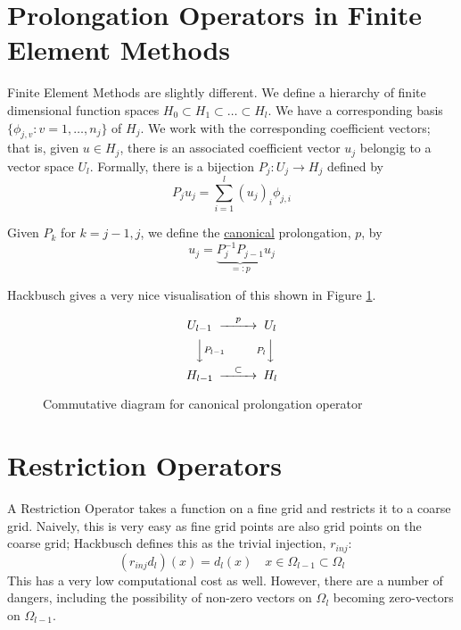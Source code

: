 \documentclass[a4paper,10pt,oneside]{book}
\theoremstyle{plain}%
\theoremstyle{definition}
\theoremstyle{remark}
\begin{document}
\section{Prolongation Operators in Finite Element Methods}
Finite Element Methods are slightly different. We define a hierarchy of finite
dimensional function spaces $H_0\subset H_1\subset\dots\subset H_l$. We have a
corresponding basis $\{\phi_{j,v}:v=1,\dots,n_j\}$ of $H_j$. We work with the
corresponding coefficient vectors; that is, given $u\in H_j$, there is an
associated coefficient vector $u_j$ belongig to a vector space $U_l$. Formally,
there is a bijection $P_j:U_j\to H_j$ defined by
\begin{equation}
 P_ju_j=\sum_{i=1}^l(u_j)_i\phi_{j,i}
\end{equation}

Given $P_k$ for $k=j-1,j$, we define the \underline{canonical} prolongation,
$p$, by
\begin{equation}
 u_j = \underbrace{P_j^{-1}P_{j-1}}_{=:p}u_j
\end{equation}

Hackbusch \cite{Hackbusch85} gives a very nice visualisation of this shown in
Figure \ref{fig:canonical_prolongation}.

\begin{figure}
 \begin{equation}
  \begin{CD}
   U_{l-1} @>p>> U_l\\
   @VV{P_{l-1}}V   @V{P_l}VV\\
   H_{l-1} @>{\subset}>> H_l
  \end{CD}
 \end{equation}
 \caption{Commutative diagram for canonical prolongation operator}
\label{fig:canonical_prolongation}
\end{figure}

\section{Restriction Operators}
A Restriction Operator takes a function on a fine grid and restricts it to a
coarse grid. Naively, this is very easy as fine grid points are also grid
points on the coarse grid; Hackbusch \cite{Hackbusch85} defines this as the
trivial injection, $r_{inj}$:
\begin{equation}
 (r_{inj}d_l)(x)=d_l(x)\quad x\in\Omega_{l-1}\subset\Omega_l
\end{equation}
This has a very low computational cost as well. However, there are a number of
dangers, including the possibility of non-zero vectors on $\Omega_l$ becoming
zero-vectors on $\Omega_{l-1}$.
\end{document}
